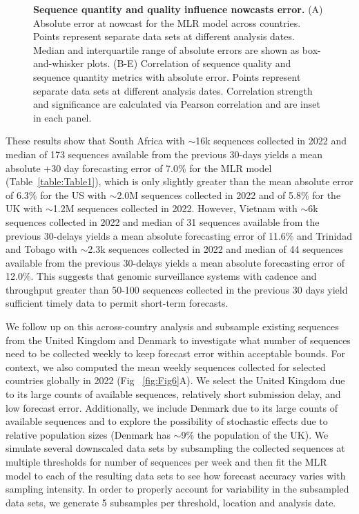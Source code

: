\documentclass[10pt,letterpaper]{article}
\begin{document}
\begin{figure}[tb!]
	\centering
	\caption{
		\textbf{Sequence quantity and quality influence nowcasts error.}
    (A) Absolute error at nowcast for the MLR model across countries.
		Points represent separate data sets at different analysis dates.
		Median and interquartile range of absolute errors are shown as box-and-whisker plots.
		(B-E) Correlation of sequence quality and sequence quantity metrics with absolute error.
		Points represent separate data sets at different analysis dates.
    Correlation strength and significance are calculated via Pearson correlation and are inset in each panel.
	}
	\label{fig:Fig5}
\end{figure}

These results show that South Africa with $\sim$16k sequences collected in 2022 and median of 173 sequences available from the previous 30-days yields a mean absolute +30 day forecasting error of 7.0\% for the MLR model (Table~\ref{table:Table1}), which is only slightly greater than the mean absolute error of 6.3\% for the US with $\sim$2.0M sequences collected in 2022 and of 5.8\% for the UK with $\sim$1.2M sequences collected in 2022.
However, Vietnam with $\sim$6k sequences collected in 2022 and median of 31 sequences available from the previous 30-delays yields a mean absolute forecasting error of 11.6\% and Trinidad and Tobago with $\sim$2.3k sequences collected in 2022 and median of 44 sequences available from the previous 30-delays yields a mean absolute forecasting error of 12.0\%.
This suggests that genomic surveillance systems with cadence and throughput greater than 50-100 sequences collected in the previous 30 days yield sufficient timely data to permit short-term forecasts.


We follow up on this across-country analysis and subsample existing sequences from the United Kingdom and Denmark to investigate what number of sequences need to be collected weekly to keep forecast error within acceptable bounds.
For context, we also computed the mean weekly sequences collected for selected countries globally in 2022 (Fig ~\ref{fig:Fig6}A).
We select the United Kingdom due to its large counts of available sequences, relatively short submission delay, and low forecast error.
Additionally, we include Denmark due to its large counts of available sequences and to explore the possibility of stochastic effects due to relative population sizes (Denmark has $\sim$9\% the population of the UK).
We simulate several downscaled data sets by subsampling the collected sequences at multiple thresholds for number of sequences per week and then fit the MLR model to each of the resulting data sets to see how forecast accuracy varies with sampling intensity.
In order to properly account for variability in the subsampled data sets, we generate 5 subsamples per threshold, location and analysis date.
\end{document}
